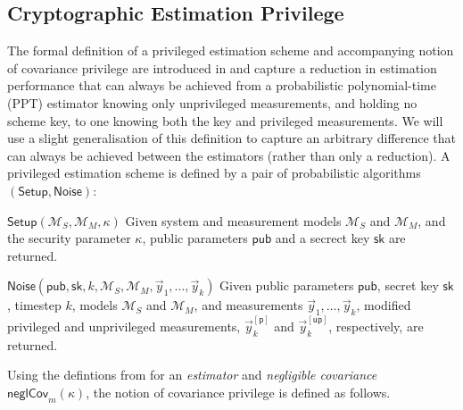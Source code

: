 \documentclass[conference]{IEEEtran}
\theoremstyle{definition}
\theoremstyle{remark}
\begin{document}
\subsection{Cryptographic Estimation Privilege}\label{subsec:crypto_privilege}
The formal definition of a privileged estimation scheme and accompanying notion of covariance privilege are introduced in \cite{risticCryptographicallyPrivilegedState2022} and capture a reduction in estimation performance that can always be achieved from a probabilistic polynomial-time (PPT) estimator knowing only unprivileged measurements, and holding no scheme key, to one knowing both the key and privileged measurements. We will use a slight generalisation of this definition to capture an arbitrary difference that can always be achieved between the estimators (rather than only a reduction).
A privileged estimation scheme is defined by a pair of probabilistic algorithms $(\mathsf{Setup}, \mathsf{Noise})$:
\begin{LaTeXdescription}
  \item[$\mathsf{Setup}(\mathcal{M}_S,\mathcal{M}_M,\kappa)$] Given system and measurement models $\mathcal{M}_S$ and $\mathcal{M}_M$, and the security parameter $\kappa$, public parameters $\mathsf{pub}$ and a secrect key $\mathsf{sk}$ are returned.
  \item[$\mathsf{Noise}(\mathsf{pub},\mathsf{sk},k,\mathcal{M}_S,\mathcal{M}_M,\vec{y}_1,\dots,\vec{y}_k)$] Given public parameters $\mathsf{pub}$, secret key $\mathsf{sk}$, timestep $k$, models $\mathcal{M}_S$ and $\mathcal{M}_M$, and measurements $\vec{y}_1,\dots,\vec{y}_k$, modified privileged and unprivileged measurements, $\vec{y}^{[\mathsf{p}]}_k$ and $\vec{y}^{[\mathsf{up}]}_k$, respectively, are returned.
\end{LaTeXdescription}
Using the defintions from \cite{risticCryptographicallyPrivilegedState2022} for an \textit{estimator} and \textit{negligible covariance} $\mathsf{neglCov}_m(\kappa)$, the notion of covariance privilege is defined as follows.
\end{document}
